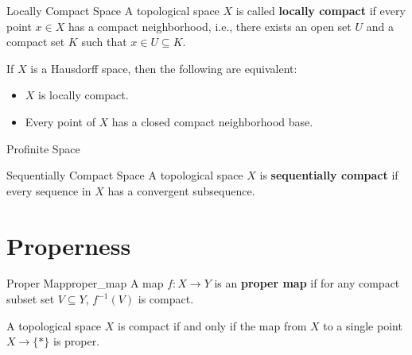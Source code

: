 \documentclass{report}
\begin{document}
\begin{definition}{Locally Compact Space}{}
	A topological space $X$ is called \textbf{locally compact} if every point $x\in X$ has a compact neighborhood, i.e., there exists an open set $U$ and a compact set $K$ such that $x \in U \subseteq K$.
\end{definition}

\begin{proposition}{}{}
	If $X$ is a Hausdorff space, then the following are equivalent:
	\begin{itemize}
		\item $X$ is locally compact.
		\item Every point of $X$ has a closed compact neighborhood base.
	\end{itemize}
\end{proposition}

\begin{definition}{Profinite Space}{}

\end{definition}

\begin{definition}{Sequentially Compact Space}{}
	A topological space $X$ is \textbf{sequentially compact} if every sequence in $X$ has a convergent subsequence.
\end{definition}

\section{Properness}
\begin{definition}{Proper Map}{proper_map}
	A map $f:X\to Y$ is an \textbf{proper map} if for any compact subset set $V\subseteq Y$, $f^{-1}(V)$ is compact.
\end{definition}
\begin{proposition}{}{}
	A topological space $X$ is compact if and only if the map from $X$ to a single point $X\to\{*\}$ is proper.
\end{proposition}
\end{document}
